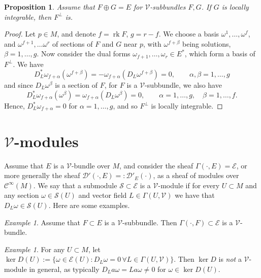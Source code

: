 \documentclass[11pt]{amsart}
\newcommand{\crb}{\mathcal{V}}
\newcommand{\cinfty}{\mathcal{C}^\infty}
\DeclareMathOperator{\rank}{rk}
\theoremstyle{definition}
\theoremstyle{remark}
\newtheorem{exa}[defn]{Example}
\theoremstyle{plain}
\newtheorem{prop}[defn]{Proposition}
\begin{document}
\begin{prop}
\label{pro:integrable} Assume that  $F \oplus G = E$ for $\mathcal{V}$-subbundles $F, G$. If $G$ is locally integrable, then  $F^\perp$ is. 
\end{prop}
\begin{proof}
Let $p\in M$, and denote $f = \rank F$, $g= r-f$. We choose a basis $\omega^1 , 
\dots , \omega^f$, and $\omega^{f+1}, \dots \omega^r$ of sections of $F$ and $G$ near $p$, with $\omega^{f+\beta}$ being solutions, $\beta = 1,\dots,g$.  
 Now consider the dual forms $\omega_{f+1}, \dots, \omega_{r} \in E^* $, which form a basis of $F^\perp$.  We have 
 \[ D_{L}^* \omega_{f+\alpha} (\omega^{f+\beta}) = -\omega_{f+\alpha} (D_{L} \omega^{f+\beta}) = 0, \qquad \alpha,\beta = 1,\dots ,g \]
 and since $D_L \omega^\beta$ is a section of $F$, for $F$ is a $\mathcal{V}$-subbundle, we also have
 \[ D_{L}^* \omega_{f+\alpha} (\omega^\beta) = \omega_{f+\alpha} (D_{L} \omega^\beta) = 0, \qquad \alpha = 1,\dots,g ,\quad \beta = 1,\dots, f. \]
 Hence, $D^*_{L} \omega_{f+\alpha} = 0$ for $\alpha = 1, \dots , g$, and 
 so $F^\perp$ is locally integrable. 
\end{proof}

\section{$\crb$-modules} %
\label{sec:cr_modules}
Assume that $E$ is a $\crb$-bundle over $M$, and consider the sheaf $\Gamma(\cdot, E)= \mathcal{E}$, or more generally
the sheaf $\mathcal{D}'(\cdot,E)=:\mathcal{D}'_E (\cdot)$, as a sheaf of modules over $\cinfty(M)$.
We say that a submodule 
$\mathcal{S} \subset \mathcal{E}$ is a $\crb$-module if for every $U\subset M$ and any section $\omega\in \mathcal{S}(U)$ and vector
field $L\in \Gamma(U,\crb)$ we have that $D_L \omega \in \mathcal{S} (U)$. Here are some examples.

\begin{exa}
  Assume that $F\subset E$ is a $\crb$-subbundle. Then $\Gamma(\cdot,F) \subset \mathcal{E}$ is a $\crb$-bundle. 
\end{exa}

\begin{exa}
  For any $U\subset M$, let $\ker D (U) := \{ \omega \in \mathcal{E} (U) \colon D_L \omega = 0 \, \forall L \in \Gamma (U,\crb) \}$.
  Then $\ker D$ is {\em not} a $\crb$-module in general, as typically $D_L a \omega = La \omega\neq 0$ for $\omega \in \ker D (U)$. 
\end{exa}
\end{document}
